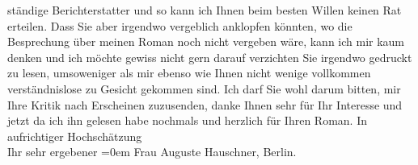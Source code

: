 \begin{ledgroupsized}[t]{13cm}
               ständige Berichterstatter und so kann ich Ihnen beim besten Willen keinen Rat
               erteilen. Dass Sie aber irgendwo vergeblich anklopfen könnten, wo die Besprechung
               über meinen Roman noch nicht
               vergeben wäre, kann ich mir kaum denken und ich möchte gewiss nicht gern darauf
               verzichten Sie irgendwo gedruckt zu lesen, umsoweniger als mir ebenso wie Ihnen nicht
               wenige vollkommen verständnislose zu Gesicht gekommen sind. Ich darf Sie wohl darum
               bitten, mir Ihre Kritik nach
               Erscheinen zuzusenden, danke Ihnen sehr für Ihr Interesse und jetzt da ich ihn
               gelesen habe {\pb}nochmals und herzlich für Ihren Roman.\pend
           \pstart
           In aufrichtiger Hochschätzung{\\[\baselineskip]}Ihr sehr ergebener\pend
           \leftskip=0em{}{\bigskip}\pstart
           \noindent{}Frau Auguste Hauschner, Berlin.\pend
           \endnumbering{}\end{ledgroupsized}  \newcommand{\dateiname}{L02585}\newcommand{\titel}{Arthur Schnitzler an Auguste Hauschner, 12. 10. 1908}\newcommand{\editorInnen}{Martin Anton Müller und Laura Untner}
      